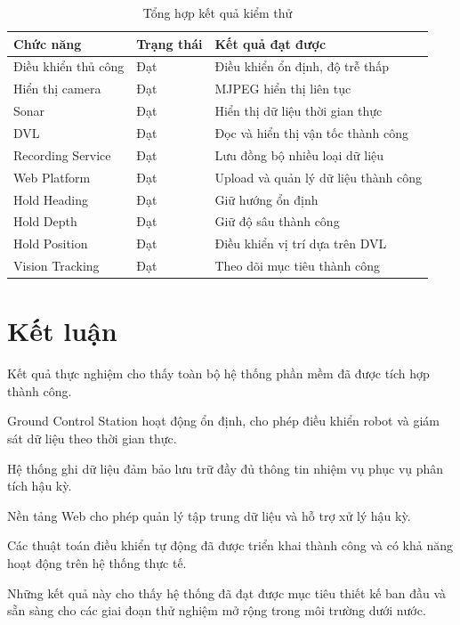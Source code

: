 \documentclass[../DoAn.tex]{subfiles}
\begin{document}
\begin{table}[H]
\centering
\caption{Tổng hợp kết quả kiểm thử}
\renewcommand{\arraystretch}{1.3}

\begin{tabular}{|p{5cm}|p{4cm}|p{6cm}|}
\hline
\textbf{Chức năng} & \textbf{Trạng thái} & \textbf{Kết quả đạt được} \\ \hline

Điều khiển thủ công &
Đạt &
Điều khiển ổn định, độ trễ thấp \\ \hline

Hiển thị camera &
Đạt &
MJPEG hiển thị liên tục \\ \hline

Sonar &
Đạt &
Hiển thị dữ liệu thời gian thực \\ \hline

DVL &
Đạt &
Đọc và hiển thị vận tốc thành công \\ \hline

Recording Service &
Đạt &
Lưu đồng bộ nhiều loại dữ liệu \\ \hline

Web Platform &
Đạt &
Upload và quản lý dữ liệu thành công \\ \hline

Hold Heading &
Đạt &
Giữ hướng ổn định \\ \hline

Hold Depth &
Đạt &
Giữ độ sâu thành công \\ \hline

Hold Position &
Đạt &
Điều khiển vị trí dựa trên DVL \\ \hline

Vision Tracking &
Đạt &
Theo dõi mục tiêu thành công \\ \hline

\end{tabular}
\end{table}

\section{Kết luận}

Kết quả thực nghiệm cho thấy toàn bộ hệ thống phần mềm đã được tích hợp thành công.

Ground Control Station hoạt động ổn định, cho phép điều khiển robot và giám sát dữ liệu theo thời gian thực.

Hệ thống ghi dữ liệu đảm bảo lưu trữ đầy đủ thông tin nhiệm vụ phục vụ phân tích hậu kỳ.

Nền tảng Web cho phép quản lý tập trung dữ liệu và hỗ trợ xử lý hậu kỳ.

Các thuật toán điều khiển tự động đã được triển khai thành công và có khả năng hoạt động trên hệ thống thực tế.

Những kết quả này cho thấy hệ thống đã đạt được mục tiêu thiết kế ban đầu và sẵn sàng cho các giai đoạn thử nghiệm mở rộng trong môi trường dưới nước.
\end{document}
